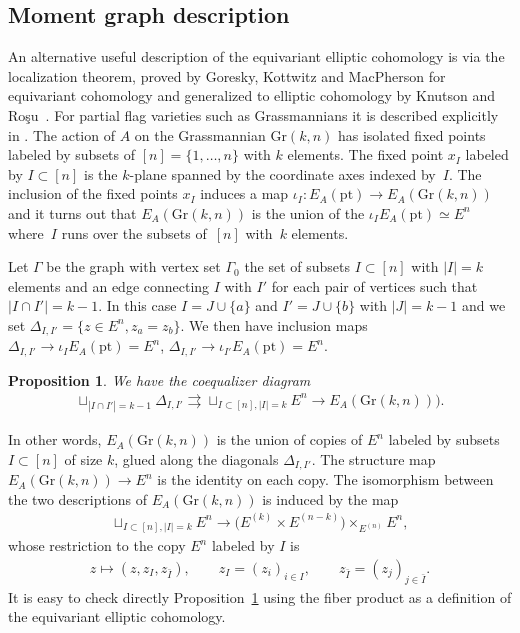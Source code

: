 \documentclass[10pt,a4paper]{amsart}
\numberwithin{equation}{section}
\newtheorem{Proposition}[Theorem]{Proposition}
 { \theoremstyle{definition}
\newtheorem{Definition}[Theorem]{Definition}
\newtheorem{Example}[Theorem]{Example}
\newtheorem{Remark}[Theorem]{Remark} }
\begin{document}
\subsection{Moment graph description} An alternative useful description of the equivariant elliptic cohomology is via the localization theorem, proved by Goresky, Kottwitz and MacPherson \cite{GKM} for equivariant cohomology and generalized to elliptic cohomology by Knutson and Ro\c{s}u~\cite{Rosu}. For partial flag varieties such as Grassmannians it is described explicitly in \cite[Example~4.4]{Ganter}. The action of $A$ on the Grassmannian
$\mathrm{Gr}(k,n)$ has isolated fixed points labeled by subsets of $[n]=\{1,\dots,n\}$ with $k$ elements. The fixed point $x_I$ labeled by $I\subset[n]$ is the $k$-plane spanned by the coordinate axes indexed by~$I$. The inclusion of the fixed points $x_I$ induces a map $\iota_I\colon E_A(\mathrm{pt})\to E_A(\mathrm{Gr}(k,n))$ and it turns out that $E_A(\mathrm{Gr}(k,n))$ is the union of the $\iota_{I}E_A(\mathrm{pt})\simeq E^n$ where~$I$ runs over the subsets of~$[n]$ with~$k$ elements.

Let $\Gamma$ be the graph with vertex set $\Gamma_0$ the set of subsets $I\subset [n]$ with $|I|=k$ elements and an edge connecting $I$ with $I'$ for each pair of vertices such that $|I\cap I'|=k-1$. In this case $I=J\cup\{a\}$ and $I'=J\cup\{b\}$ with $|J|=k-1$ and we set $\Delta_{I,I'}=\{z\in E^n, z_a=z_b\}$. We then have inclusion maps $\Delta_{I,I'}\to \iota_{I}E_A(\mathrm {pt})=E^n$, $\Delta_{I,I'}\to \iota_{I'}E_A(\mathrm {pt})=E^n$.
\begin{Proposition}\label{p-001} We have the coequalizer diagram
 \begin{gather*}
 \sqcup_{|I\cap I'|=k-1}\Delta_{I,I'}\rightrightarrows \sqcup_{I\subset [n],|I|=k}E^n\to E_{A}(\mathrm{Gr}(k,n))).
 \end{gather*}
\end{Proposition}
In other words, $E_A(\mathrm{Gr}(k,n))$ is the union of copies of $E^n$ labeled by subsets $I\subset [n]$ of size $k$, glued along the diagonals $\Delta_{I,I'}$. The structure map $E_A(\mathrm{Gr}(k,n))\to E^n$ is the identity on each copy. The isomorphism between the two descriptions of $E_A(\mathrm{Gr}(k,n))$ is induced by the map
\begin{gather*}
 \sqcup_{I\subset [n],|I|=k}E^n\to \big(E^{(k)}\times E^{(n-k)}\big)\times_{E^{(n)}}E^n,
\end{gather*}
whose restriction to the copy $E^n$ labeled by $I$ is
\begin{gather*} z\mapsto (z,z_I,z_{\bar I}),\qquad z_I=(z_i)_{i\in I}, \qquad z_{\bar I}=(z_j)_{j\in \bar I}.
\end{gather*}
It is easy to check directly Proposition~\ref{p-001} using the fiber product as a definition of the equivariant elliptic cohomology.
\end{document}

